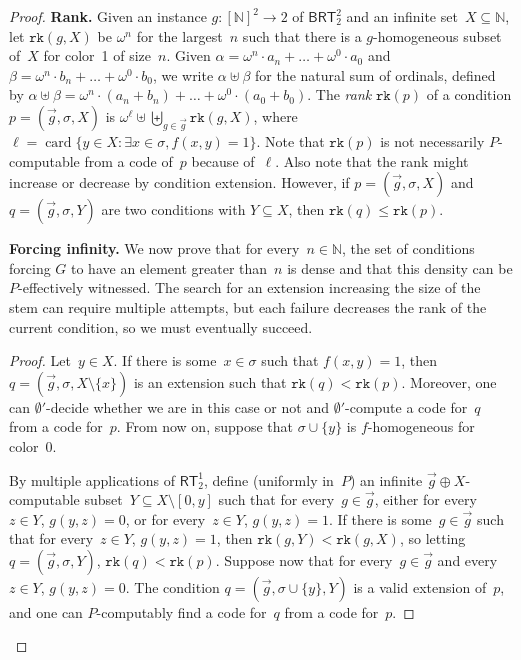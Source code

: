 \documentclass{article}
\newcommand{\RT}[0]{\mathsf{RT}}
\newcommand{\BRT}[0]{\mathsf{BRT}}
\newcommand{\NN}[0]{\mathbb{N}}
\newcommand{\card}{\operatorname{card}}
\newcommand{\rank}{\mathtt{rk}}
\numberwithin{theorem}{section}
\newtheorem{lemma}[theorem]{Lemma}
\begin{document}
\begin{proof}
\noindent
\textbf{Rank.}
Given an instance $g : [\NN]^2 \to 2$ of $\BRT^2_2$ and an infinite set~$X \subseteq \NN$,
let $\rank(g, X)$ be $\omega^n$ for the largest~$n$ such that there is a $g$-homogeneous subset of~$X$ for color~1 of size~$n$. Given $\alpha = \omega^n \cdot a_n + \dots + \omega^0 \cdot a_0$ and $\beta = \omega^n \cdot b_n + \dots + \omega^0 \cdot b_0$, we write $\alpha \uplus \beta$ for the natural sum of ordinals, defined by $\alpha \uplus \beta = \omega^n \cdot (a_n + b_n) + \dots + \omega^0 \cdot (a_0 + b_0)$. The \emph{rank} 
$\rank(p)$ of a condition $p = (\vec{g}, \sigma, X)$ is $\omega^\ell \uplus \biguplus_{g \in \vec{g}} \rank(g, X)$, where $\ell = \card \{ y \in X : \exists x \in \sigma, f(x, y) = 1 \}$. Note that $\rank(p)$ is not necessarily $P$-computable from a code of~$p$ because of~$\ell$. Also note that the rank might increase or decrease by condition extension. However, if $p = (\vec{g}, \sigma, X)$ and $q = (\vec{g}, \sigma, Y)$ are two conditions with $Y \subseteq X$, then $\rank(q) \leq \rank(p)$. 
\bigskip

\noindent
\textbf{Forcing infinity.}
We now prove that for every~$n \in \NN$, the set of conditions forcing $G$ to have an element greater than~$n$ is dense and that this density can be $P$-effectively witnessed. The search for an extension increasing the size of the stem can require multiple attempts, but each failure decreases the rank of the current condition, so we must eventually succeed.

\begin{proof}
Let~$y \in X$. If there is some~$x \in \sigma$ such that $f(x, y) = 1$, then $q = (\vec{g}, \sigma, X \setminus \{x\})$ is an extension such that $\rank(q) < \rank(p)$. Moreover, one can $\emptyset'$-decide whether we are in this case or not and $\emptyset'$-compute a code for~$q$ from a code for~$p$. From now on, suppose that $\sigma \cup \{y\}$ is $f$-homogeneous for color~0.

By multiple applications of $\RT^1_2$, define (uniformly in~$P$) an infinite $\vec{g} \oplus X$-computable subset~$Y \subseteq X \setminus [0,y]$ such that for every~$g \in \vec{g}$, either for every~$z \in Y$, $g(y, z) = 0$, or for every~$z \in Y$, $g(y, z) = 1$. If there is some~$g \in \vec{g}$ such that for every~$z \in Y$, $g(y, z) = 1$, then $\rank(g,  Y) < \rank(g, X)$, so letting $q = (\vec{g}, \sigma, Y)$, $\rank(q) < \rank(p)$. Suppose now that for every~$g \in \vec{g}$ and every~$z \in Y$, $g(y, z) = 0$.
The condition $q = (\vec{g}, \sigma \cup \{y\}, Y)$ is a valid extension of~$p$, and one can $P$-computably find a code for~$q$ from a code for~$p$.
\end{proof}
\bigskip


\end{proof}
\end{document}
